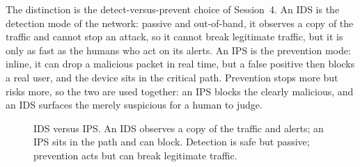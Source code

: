 The distinction is the detect-versus-prevent choice of Session~4. An IDS is
the detection mode of the network: passive and out-of-band, it observes a
copy of the traffic and cannot stop an attack, so it cannot break legitimate
traffic, but it is only as fast as the humans who act on its alerts. An IPS
is the prevention mode: inline, it can drop a malicious packet in real time,
but a false positive then blocks a real user, and the device sits in the
critical path. Prevention stops more but risks more, so the two are used
together: an IPS blocks the clearly malicious, and an IDS surfaces the merely
suspicious for a human to judge.

\begin{figure}[htbp]
\centering
{}
\caption{IDS versus IPS. An IDS observes a copy of the traffic and alerts; an
IPS sits in the path and can block. Detection is safe but passive; prevention
acts but can break legitimate traffic.}
\label{fig:idsips}
\end{figure}

